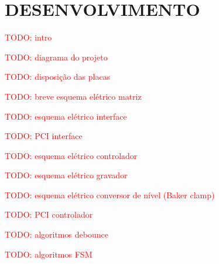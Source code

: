
\chapter{DESENVOLVIMENTO}
\label{chap:metodologia}

\textcolor{red}{TODO: intro}

\textcolor{red}{TODO: diagrama do projeto}

\textcolor{red}{TODO: disposição das placas}

\textcolor{red}{TODO: breve esquema elétrico matriz}

\textcolor{red}{TODO: esquema elétrico interface}

\textcolor{red}{TODO: PCI interface}

\textcolor{red}{TODO: esquema elétrico controlador}

\textcolor{red}{TODO: esquema elétrico gravador}

\textcolor{red}{TODO: esquema elétrico conversor de nível (Baker clamp)}

\textcolor{red}{TODO: PCI controlador}

\textcolor{red}{TODO: algoritmos debounce}

\textcolor{red}{TODO: algoritmos FSM}

